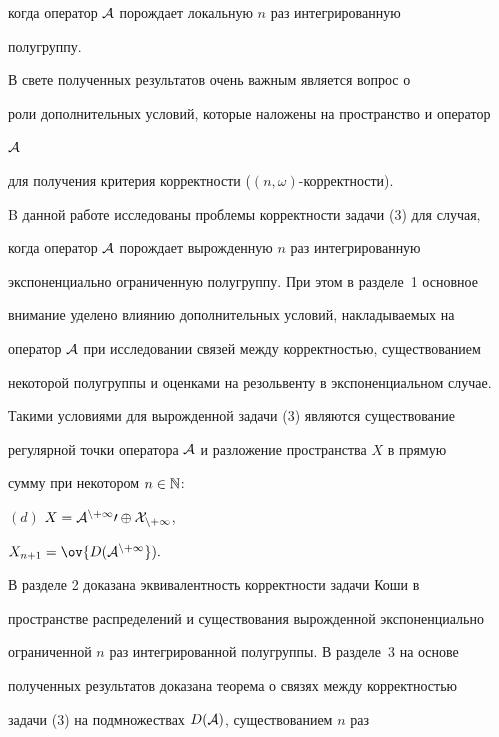 когда оператор $\cal A$ порождает локальную $n$ раз интегрированную 


полугруппу. 


В свете полученных результатов очень важным является вопрос о 


роли дополнительных условий, которые наложены на пространство и оператор 


$\cal A$ 


для получения критерия корректности ($(n,\omega)$-корректности). 


 


B данной работе исследованы проблемы корректности задачи (3) для случая, 


когда оператор $\cal A$ порождает вырожденную $n$ раз интегрированную 


экспоненциально ограниченную полугруппу. При этом в разделе~1 основное 


внимание уделено влиянию дополнительных условий, накладываемых на 


оператор $\cal A$ при исследовании связей между корректностью, существованием 


некоторой полугруппы и оценками на резольвенту в экспоненциальном случае. 


Такими условиями для вырожденной задачи (3) являются существование 


регулярной точки оператора $\cal A$ и разложение пространства $X$ в прямую 


сумму при некотором $n\in\Bbb N$: 


\medskip


 


\noindent{}$(d)$ \hfil $X=\cal A^{n+1}0\oplus X_{n+1}$, 


\quad $X_{n+1}=\ov{D(\cal A^{n+1}}).$\hfil 


\medskip


 


В разделе 2 доказана эквивалентность корректности задачи Коши в 


пространстве распределений и существования вырожденной экспоненциально 


ограниченной $n$ раз интегрированной полугруппы. В разделе~3 на основе 


полученных результатов доказана теорема о связях между корректностью 


задачи (3) на подмножествах $D(\cal A)$, существованием $n$ раз 


